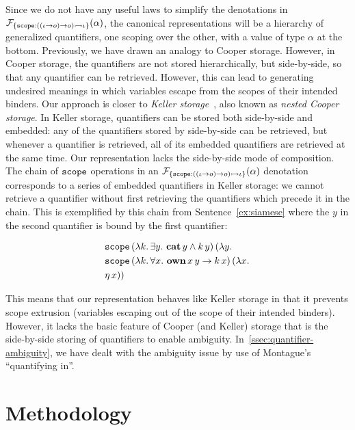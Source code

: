 Since we do not have any useful laws to simplify the denotations in
$\mathcal{F}_{\{ \mathtt{scope} : ((\iota \to o) \to o) \rightarrowtail \iota \}}(\alpha)$, the
canonical representations will be a hierarchy of generalized quantifiers,
one scoping over the other, with a value of type $\alpha$ at the
bottom. Previously, we have drawn an analogy to Cooper storage. However, in
Cooper storage, the quantifiers are not stored hierarchically, but
side-by-side, so that any quantifier can be retrieved. However, this can
lead to generating undesired meanings in which variables escape from the
scopes of their intended binders. Our approach is closer to \emph{Keller
  storage}~\cite{keller1988nested}, also known as \emph{nested Cooper
  storage}. In Keller storage, quantifiers can be stored both side-by-side
and embedded: any of the quantifiers stored by side-by-side can be
retrieved, but whenever a quantifier is retrieved, all of its embedded
quantifiers are retrieved at the same time. Our representation lacks the
side-by-side mode of composition. The chain of $\mathtt{scope}$ operations in
an $\mathcal{F}_{\{ \mathtt{scope} : ((\iota \to o) \to o) \rightarrowtail \iota \}}(\alpha)$
denotation corresponds to a series of embedded quantifiers in Keller
storage: we cannot retrieve a quantifier without first retrieving the
quantifiers which precede it in the chain. This is exemplified by this
chain from Sentence~\ref{ex:siamese} where the $y$ in the second quantifier
is bound by the first quantifier:

\begin{align*}
&\mathtt{scope}\,(\lambda k.\, \exists y.\ \textbf{cat}\,y \land k\,y)\,(\lambda y.\,  \\
&\mathtt{scope}\,(\lambda k.\, \forall x.\ \textbf{own}\,x\,y \to k\,x)\,(\lambda x.\,  \\
&\eta\,x))
\end{align*}

This means that our representation behaves like Keller storage in that it
prevents scope extrusion (variables escaping out of the scope of their
intended binders). However, it lacks the basic feature of Cooper (and
Keller) storage that is the side-by-side storing of quantifiers to enable
ambiguity. In~\ref{ssec:quantifier-ambiguity}, we have dealt with the
ambiguity issue by use of Montague's ``quantifying in''.


\section{Methodology}
\label{sec:methodology}

